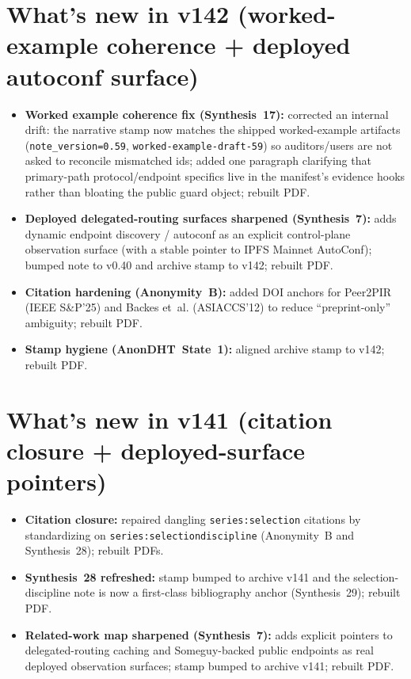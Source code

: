 \documentclass[11pt]{article}
\begin{document}
\section{What's new in v142 (worked-example coherence + deployed autoconf surface)}
\begin{itemize}[leftmargin=*]
\item \textbf{Worked example coherence fix (Synthesis~17):} corrected an internal drift: the narrative stamp now matches the shipped worked-example artifacts (\texttt{note\_version=0.59}, \texttt{worked-example-draft-59}) so auditors/users are not asked to reconcile mismatched ids; added one paragraph clarifying that primary-path protocol/endpoint specifics live in the manifest's evidence hooks rather than bloating the public guard object; rebuilt PDF.
\item \textbf{Deployed delegated-routing surfaces sharpened (Synthesis~7):} adds dynamic endpoint discovery / autoconf as an explicit control-plane observation surface (with a stable pointer to IPFS Mainnet AutoConf); bumped note to v0.40 and archive stamp to v142; rebuilt PDF.
\item \textbf{Citation hardening (Anonymity~B):} added DOI anchors for Peer2PIR (IEEE S\&P'25) and Backes et~al. (ASIACCS'12) to reduce ``preprint-only'' ambiguity; rebuilt PDF.
\item \textbf{Stamp hygiene (AnonDHT~State~1):} aligned archive stamp to v142; rebuilt PDF.
\end{itemize}
\section{What's new in v141 (citation closure + deployed-surface pointers)}
\begin{itemize}[leftmargin=*]
\item \textbf{Citation closure:} repaired dangling \texttt{series:selection} citations by standardizing on \texttt{series:selectiondiscipline} (Anonymity~B and Synthesis~28); rebuilt PDFs.
\item \textbf{Synthesis~28 refreshed:} stamp bumped to archive v141 and the selection-discipline note is now a first-class bibliography anchor (Synthesis~29); rebuilt PDF.
\item \textbf{Related-work map sharpened (Synthesis~7):} adds explicit pointers to delegated-routing caching and Someguy-backed public endpoints as real deployed observation surfaces; stamp bumped to archive v141; rebuilt PDF.
\end{itemize}
\end{document}
